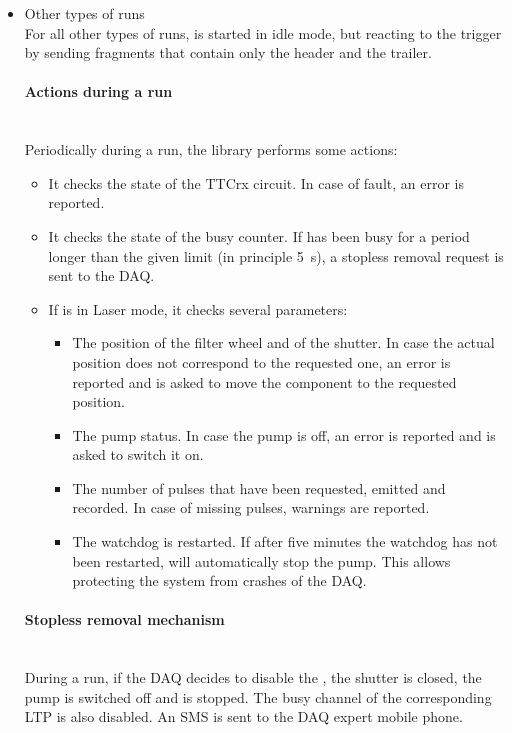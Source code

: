 \begin{itemize}
\item{Other types of runs}~\\
For all other types of runs, \lascar{} is started in idle mode, but reacting to the
trigger by sending fragments that contain only the header and the trailer.

\paragraph{Actions during a run}
~~\\
Periodically during a run, the \lasmodule{} library performs some actions:
\begin{itemize}
\item It checks the state of the \lascar{} TTCrx circuit. In case of fault, an error is reported.
\item It checks the state of the busy counter. If \lascar{} has been busy for a period longer
than the given limit (in principle 5~s), a stopless removal request is sent to the DAQ.
\item If \lascar{} is in Laser mode, it checks several parameters:
  \begin{itemize}
  \item The position of the filter wheel and of the shutter. In case the actual position does not
    correspond to the requested one, an error is reported and \lascar{} is asked to move the
    component to the requested position.
  \item The \las{} pump status. In case the pump is off, an error is reported and \lascar{} is
    asked to switch it on.
  \item The number of \las{} pulses that have been 
    requested, emitted and recorded. In case of missing pulses, warnings are reported.
  \item The \lascar{} watchdog is restarted. If after five minutes the watchdog has
    not been restarted, \lascar{} will automatically stop the \las{} pump. This allows protecting
    the \lasii{} system from crashes of the \atlas{} DAQ.
  \end{itemize}
\end{itemize}

\paragraph{Stopless removal mechanism}
~~\\
During a run, if the \atlas{} DAQ decides to disable the \lasmodule{}, the shutter is closed,
the \las{} pump is switched off and \lascar{} is stopped. The busy channel of the corresponding
LTP is also disabled. An SMS is sent to the DAQ expert mobile phone.


\end{itemize}
